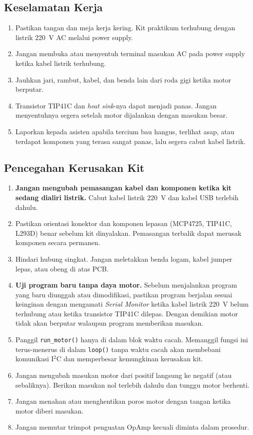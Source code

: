 \documentclass[11pt,a4paper]{article}
\begin{document}
\subsection{Keselamatan Kerja}
\begin{enumerate}
	\item Pastikan tangan dan meja kerja kering. Kit praktikum terhubung dengan listrik 220~V AC melalui power supply.
	\item Jangan membuka atau menyentuh terminal masukan AC pada power supply ketika kabel listrik terhubung.
	\item Jauhkan jari, rambut, kabel, dan benda lain dari roda gigi ketika motor berputar.
	\item Transistor TIP41C dan \textit{heat sink}-nya dapat menjadi panas. Jangan menyentuhnya segera setelah motor dijalankan dengan masukan besar.
	\item Laporkan kepada asisten apabila tercium bau hangus, terlihat asap, atau terdapat komponen yang terasa sangat panas, lalu segera cabut kabel listrik.
\end{enumerate}

\subsection{Pencegahan Kerusakan Kit}
\begin{enumerate}
	\item \textbf{Jangan mengubah pemasangan kabel dan komponen ketika kit sedang dialiri listrik.} Cabut kabel listrik 220~V dan kabel USB terlebih dahulu.
	\item Pastikan orientasi konektor dan komponen lepasan (MCP4725, TIP41C, L293D) benar sebelum kit dinyalakan. Pemasangan terbalik dapat merusak komponen secara permanen.
	\item Hindari hubung singkat. Jangan meletakkan benda logam, kabel jumper lepas, atau obeng di atas PCB.
	\item \textbf{Uji program baru tanpa daya motor.} Sebelum menjalankan program yang baru diunggah atau dimodifikasi, pastikan program berjalan sesuai keinginan dengan mengamati \textit{Serial Monitor} ketika kabel listrik 220~V belum terhubung atau ketika transistor TIP41C dilepas. Dengan demikian motor tidak akan berputar walaupun program memberikan masukan.
	\item Panggil \texttt{run\_motor()} hanya di dalam blok waktu cacah. Memanggil fungsi ini terus-menerus di dalam \texttt{loop()} tanpa waktu cacah akan membebani komunikasi I$^2$C dan memperbesar kemungkinan kerusakan kit.
	\item Jangan mengubah masukan motor dari positif langsung ke negatif (atau sebaliknya). Berikan masukan nol terlebih dahulu dan tunggu motor berhenti.
	\item Jangan menahan atau menghentikan poros motor dengan tangan ketika motor diberi masukan.
	\item Jangan memutar trimpot penguatan OpAmp kecuali diminta dalam prosedur.
\end{enumerate}
\end{document}
